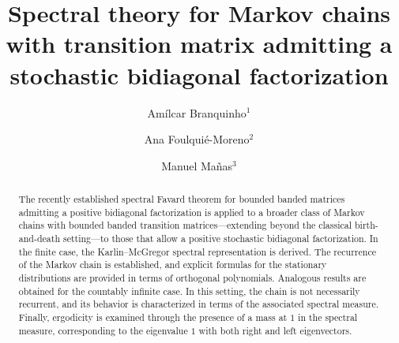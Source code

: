 \documentclass[11pt]{amsart}
\theoremstyle{plain}
\newcommand{\1}{\text{\fontseries{bx}\selectfont \textup 1}}
\begin{document}
\title[Markov chains and  stochastic bidiagonal factorization]{Spectral theory for Markov chains with  transition matrix admitting a stochastic bidiagonal factorization}





\author[A Branquinho]{Amílcar Branquinho$^{1}$}
\address{$^1$Departamento de Matemática,
 Universidade de Coimbra, 3001-454 Coimbra, Portugal}

\author[A Foulquié]{Ana Foulquié-Moreno$^{2}$}
\address{$^2$Departamento de Matemática, Universidade de Aveiro, 3810-193 Aveiro, Portugal}

\author[M Mañas]{Manuel Mañas$^{3}$}
\address{$^3$Departamento de Física Teórica, Universidad Complutense de Madrid, Plaza Ciencias 1, 28040-Madrid, Spain \&
 Instituto de Ciencias Matematicas (ICMAT), Campus de Cantoblanco UAM, 28049-Madrid, Spain}











\enlargethispage{1.25cm}

 
\begin{abstract}
The recently established spectral Favard theorem for bounded banded matrices admitting a positive bidiagonal factorization is applied to a broader class of Markov chains with bounded banded transition matrices—extending beyond the classical birth-and-death setting—to those that allow a positive stochastic bidiagonal factorization.
In the finite case, the Karlin–McGregor spectral representation is derived. The recurrence of the Markov chain is established, and explicit formulas for the stationary distributions are provided in terms of orthogonal polynomials.
Analogous results are obtained for the countably infinite case. In this setting, the chain is not necessarily recurrent, and its behavior is characterized in terms of the associated spectral measure.
Finally, ergodicity is examined through the presence of a mass at $1$ in the spectral measure, corresponding to the eigenvalue $1$ with both right and left eigenvectors.
\end{abstract}
 
\end{document}
